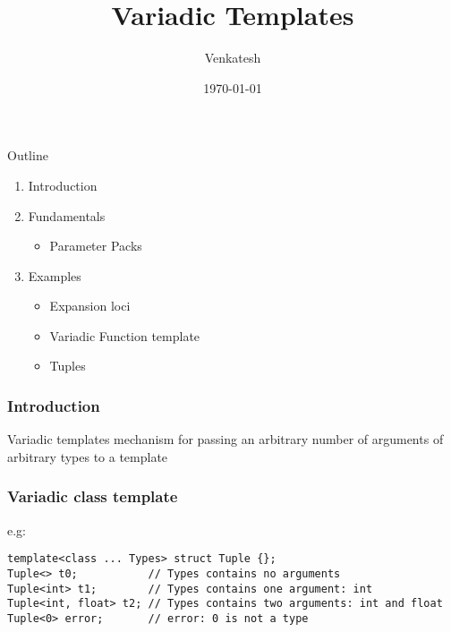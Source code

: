 \documentclass{beamer}
\title{Variadic Templates} %
\author{Venkatesh} %
\institute{WDC}
\date{\today} %
\begin{document}
\lstset{breakatwhitespace=true,
language=C++,
columns=fullflexible,
keepspaces=true,
breaklines=true,
tabsize=3, 
showstringspaces=false,
extendedchars=true
inputencoding=utf8}


\begin{frame}
\titlepage %
\end{frame}

\begin{frame}{Outline}
  \begin{enumerate}
   \item Introduction
   \item Fundamentals
        \begin{itemize}
        \item Parameter Packs
        \end{itemize}
   \item Examples
        \begin{itemize}
        \item Expansion loci
        \item Variadic Function template
        \item Tuples
        \end{itemize}
  \end{enumerate}
\end{frame}




\begin{frame}[fragile]
\frametitle{Introduction}

\begin{block}{Variadic templates}
mechanism for passing an arbitrary number of arguments of arbitrary types to a template
\end{block}

\end{frame}

\begin{frame}[fragile]
\frametitle{Variadic class template}

\begin{block}{e.g:}
\begin{lstlisting}
template<class ... Types> struct Tuple {};
Tuple<> t0;           // Types contains no arguments
Tuple<int> t1;        // Types contains one argument: int
Tuple<int, float> t2; // Types contains two arguments: int and float
Tuple<0> error;       // error: 0 is not a type
\end{lstlisting}
\end{block}

\end{frame}
\end{document}
